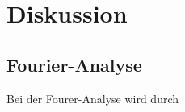 \section{Diskussion}
\label{sec:Diskussion}
\subsection{Fourier-Analyse}
Bei der Fourer-Analyse wird durch 